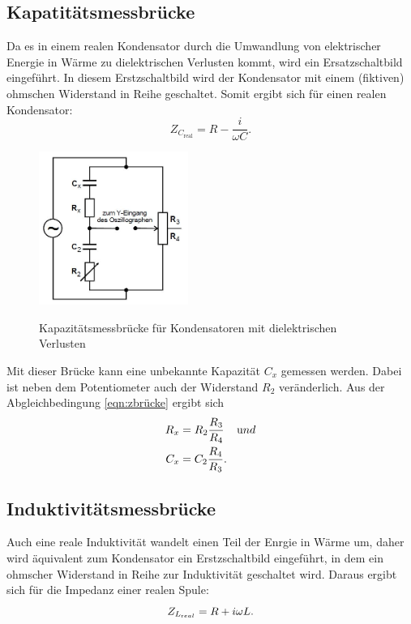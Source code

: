 \subsection{Kapatitätsmessbrücke}
Da es in einem realen Kondensator durch die Umwandlung von elektrischer Energie in
Wärme zu dielektrischen Verlusten kommt, wird ein Ersatzschaltbild eingeführt.
In diesem Erstzschaltbild wird der Kondensator mit einem (fiktiven) ohmschen Widerstand
in Reihe geschaltet. Somit ergibt sich für einen realen Kondensator:
\begin{equation*}
  Z_{C_{\text{real}}}=R-\frac{i}{\omega C}.
  \label{eqn:zcreal}
\end{equation*}
\begin{figure}[H]
  \centering
  \includegraphics[height=5cm]{kapazitat.JPG}
  \caption{Kapazitätsmessbrücke für Kondensatoren mit dielektrischen Verlusten}
  \label{fig:kapazitat}
  \cite{skript}
\end{figure}
Mit dieser Brücke kann eine unbekannte Kapazität $C_{x}$ gemessen werden.
Dabei ist neben dem Potentiometer auch der Widerstand
$R_{2}$ veränderlich.
Aus der Abgleichbedingung \ref{eqn:zbrücke} ergibt sich
\begin{align}
  R_{x} &=R_{2}\frac{R_{3}}{R_{4}} \;\;\;\;\text und \\
  C_{x} &=C_{2}\frac{R_{4}}{R_{3}}.
\end{align}

\subsection{Induktivitätsmessbrücke}
 Auch eine reale Induktivität wandelt einen Teil der Enrgie in Wärme um, daher wird äquivalent
 zum Kondensator ein Erstzschaltbild eingeführt, in dem ein ohmscher Widerstand in Reihe
 zur Induktivität geschaltet wird.
 Daraus ergibt sich für die Impedanz einer realen Spule:
 \begin{equation}
   Z_{L_{\text real}}= R + i\omega L.
   \label{zlreal}
 \end{equation}

